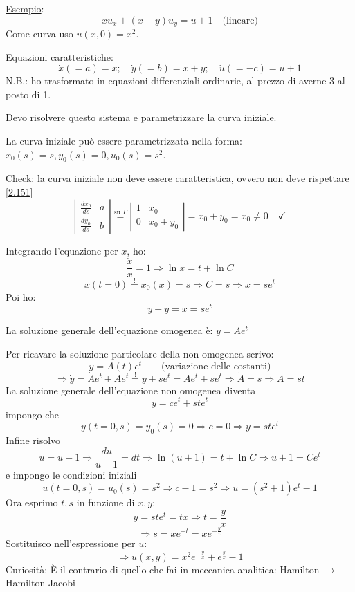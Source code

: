 \documentclass[a4paper,11pt]{report}
\begin{document}
\medskip

\underline{Esempio}:
\[
xu_x + (x+y)u_y = u+1\quad \text{(lineare)}
\]
Come curva uso $u(x,0)=x^2$. 

Equazioni caratteristiche:
\[
\dot{x}(=a)=x; \quad \dot{y}(=b)=x+y; \quad \dot{u}(=-c)=u+1
\]
N.B.: ho trasformato in equazioni differenziali ordinarie, al prezzo di averne 3 al posto di 1.

Devo risolvere questo sistema e parametrizzare la curva iniziale.

La curva iniziale pu\`o essere parametrizzata nella forma: $x_0(s)=s, y_0(s)=0, u_0(s)=s^2$. 

Check: la curva iniziale non deve essere caratteristica, ovvero non deve rispettare \eqref{2.151}
\[
\left|\begin{matrix}
\frac{dx_0}{ds} & a \\
\frac{dy_0}{ds} & b
\end{matrix}\right| \overset{\text{su }\Gamma}{=} \left| \begin{matrix}
1 & x_0 \\
0 & x_0+y_0
\end{matrix} \right| = x_0 + y_0 = x_0 \neq 0 \quad \checkmark
\]

Integrando l'equazione per $x$, ho:
\[
\frac{\dot{x}}{x}=1 \Rightarrow \ln x = t + \ln C
\]
\[
x(t=0)\overset{!}{=}x_0(x) =s \Rightarrow C=s \Rightarrow x=se^t
\]
Poi ho:
\[
\dot{y}-y=x=se^t
\]

La soluzione generale dell'equazione omogenea \`e: $y=Ae^t$

Per ricavare la soluzione particolare della non omogenea scrivo:
 \[
 y=A(t)e^t \qquad \text{(variazione delle costanti)}
 \]
 \[
 \Rightarrow \dot{y}=\dot{A}e^t + Ae^t \overset{!}{=} y+se^t = Ae^t + se^t \Rightarrow \dot{A}=s \Rightarrow A=st
 \]
La soluzione generale dell'equazione non omogenea diventa 
\[
y=ce^t + st e^t
\]
impongo che 
\[
y(t=0,s)=y_0(s)=0 \Rightarrow c=0 \Rightarrow y=ste^t
\]
Infine risolvo
\[
\dot{u}=u+1\Rightarrow \frac{du}{u+1}=dt \Rightarrow \ln(u+1)=t+\ln C \Rightarrow u+1 = Ce^t
\]
e impongo le condizioni iniziali 
\[
u(t=0,s)=u_0(s)=s^2 \Rightarrow c-1=s^2 \Rightarrow u=(s^2 + 1)e^t -1
\]
Ora esprimo $t,s$ in funzione di $x,y$: 
\[
y=ste^t =tx \Rightarrow t=\frac{y}{x}
\]
\[
\Rightarrow s=xe^{-t}=xe^{-\frac{y}{x}}
\]
Sostituisco nell'espressione per $u$:
\[
\Rightarrow u(x,y)=x^2e^{-\frac{y}{x}}+e^{\frac{y}{x}}-1
\]
Curiosit\`a: \`E il contrario di quello che fai in meccanica analitica: Hamilton $\rightarrow$ Hamilton-Jacobi
\end{document}

